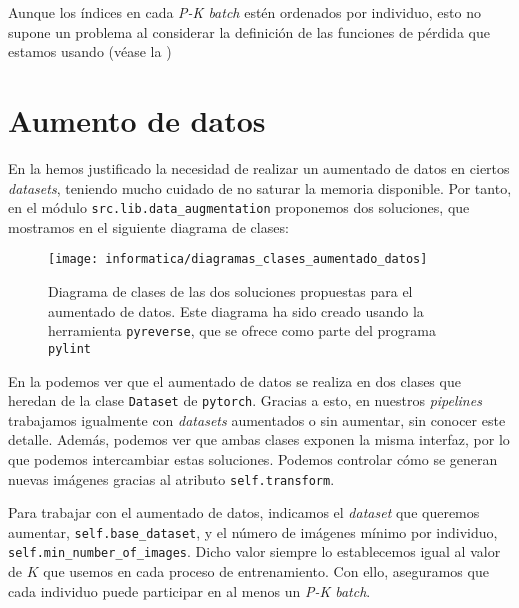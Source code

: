 \begin{observacion}

	Aunque los índices en cada \textit{P-K batch} estén ordenados por individuo, esto no supone un problema al considerar la definición de las funciones de pérdida que estamos usando (véase la )

\end{observacion}

\section{Aumento de datos} \label{isec:aumentado_datos}

En la  hemos justificado la necesidad de realizar un aumentado de datos en ciertos \textit{datasets}, teniendo mucho cuidado de no saturar la memoria disponible. Por tanto, en el módulo \lstinline{src.lib.data_augmentation} proponemos dos soluciones, que mostramos en el siguiente diagrama de clases:

\begin{figure}[H]
	\centering
	\texttt{[image: informatica/diagramas\_clases\_aumentado\_datos]}
	\caption{Diagrama de clases de las dos soluciones propuestas para el aumentado de datos. Este diagrama ha sido creado usando la herramienta \lstinline{pyreverse}, que se ofrece como parte del programa \lstinline{pylint}}
	\label{img:diagrama_clases_aumentado_datos}
\end{figure}

En la  podemos ver que el aumentado de datos se realiza en dos clases que heredan de la clase \lstinline{Dataset} de \lstinline{pytorch}. Gracias a esto, en nuestros \textit{pipelines} trabajamos igualmente con \textit{datasets} aumentados o sin aumentar, sin conocer este detalle. Además, podemos ver que ambas clases exponen la misma interfaz, por lo que podemos intercambiar estas soluciones. Podemos controlar cómo se generan nuevas imágenes gracias al atributo \lstinline{self.transform}.

Para trabajar con el aumentado de datos, indicamos el \textit{dataset} que queremos aumentar, \lstinline{self.base_dataset}, y el número de imágenes mínimo por individuo, \lstinline{self.min_number_of_images}. Dicho valor siempre lo establecemos igual al valor de $K$ que usemos en cada proceso de entrenamiento. Con ello, aseguramos que cada individuo puede participar en al menos un \textit{P-K batch}.

